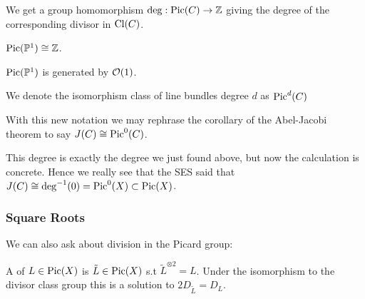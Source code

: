 \documentclass{article}
\begin{document}
\begin{corollary}
	We get a group homomorphism $\deg:\operatorname{Pic}(C) \to \mathbb{Z}$ giving the degree of the corresponding divisor in $\operatorname{Cl}(C)$. 
\end{corollary}

\begin{corollary}
	$\operatorname{Pic}(\mathbb{P}^1) \cong \mathbb{Z}$. 
\end{corollary}
\begin{prop}
	$\operatorname{Pic}(\mathbb{P}^1)$ is generated by $\mathcal{O}(1)$.  
\end{prop}


\begin{notation}
	We denote the isomorphism class of line bundles degree $d$ as $\operatorname{Pic}^d(C)$
\end{notation}

\begin{remark}
	With this new notation we may rephrase the corollary of the Abel-Jacobi theorem to say $J(C) \cong \operatorname{Pic}^0(C)$. 
\end{remark}

\begin{remark}
	This degree is exactly the degree we just found above, but now the calculation is concrete. Hence we really see that the SES said that $J(C) \cong \deg^{-1}(0) =\operatorname{Pic}^0(X) \subset \operatorname{Pic}(X)$.
\end{remark}

\subsubsection{Square Roots}
We can also ask about division in the Picard group:

\begin{definition}
	A  of $L \in \operatorname{Pic}(X)$ is $\tilde{L} \in \operatorname{Pic}(X)$ s.t $\tilde{L}^{\otimes 2}= L$. Under the isomorphism to the divisor class group this is a solution to $2D_{\tilde{L}} = D_L$. 
\end{definition}
\end{document}
